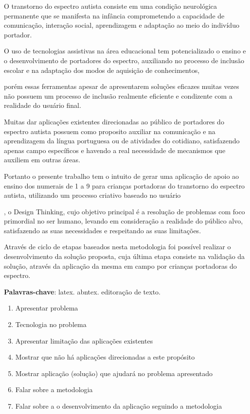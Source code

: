 \setlength{\absparsep}{18pt} %
\begin{resumo}
	O transtorno do espectro autista consiste em uma condição neurológica permanente que se manifesta na infância comprometendo a capacidade de comunicação, interação social, aprendizagem e adaptação ao meio do indivíduo portador. 

	O uso de tecnologias assistivas na área educacional tem potencializado o ensino e o desenvolvimento de portadores do espectro, auxiliando no processo de inclusão escolar e na adaptação dos modos de aquisição de conhecimentos, 

	porém essas ferramentas apesar de apresentarem soluções eficazes muitas vezes não possuem um processo de inclusão realmente eficiente e condizente com a realidade do usuário final. 

	Muitas dar aplicações existentes direcionadas ao público de portadores do espectro autista possuem como proposito auxiliar na comunicação e na aprendizagem da língua portuguesa ou de atividades do cotidiano, satisfazendo apenas campo específicos e havendo a real necessidade de mecanismos que auxiliem em outras áreas.

	Portanto o presente trabalho tem o intuito de gerar uma aplicação de apoio ao ensino dos numerais de 1 a 9 para crianças portadoras do transtorno do espectro autista, utilizando um processo criativo baseado no usuário

	, o Design Thinking, cujo objetivo principal é a resolução de problemas com foco primordial no ser humano, levando em consideração a realidade do público alvo, satisfazendo as suas necessidades e respeitando as suas limitações.  

	Através de ciclo de etapas baseados nesta metodologia foi possível realizar o desenvolvimento da solução proposta, cuja última etapa consiste na validação da solução, através da aplicação da mesma em campo por crianças portadoras do espectro.

	\textbf{Palavras-chave}: latex. abntex. editoração de texto.
	\newpage
	\begin{enumerate}
		\item Apresentar problema
		\item Tecnologia no problema
		\item Apresentar limitação das aplicações existentes
		\item Mostrar que não há aplicações direcionadas a este propósito
		\item Mostrar aplicação (solução) que ajudará no problema apresentado
		\item Falar sobre a metodologia
		\item Falar sobre a o desenvolvimento da aplicação seguindo a metodologia
	\end{enumerate}



\end{resumo}
